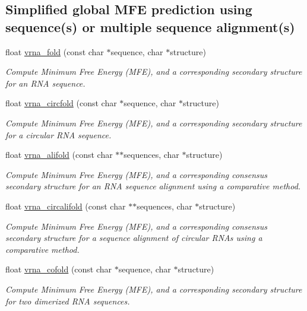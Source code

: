 \subsection*{Simplified global M\+FE prediction using sequence(s) or multiple sequence alignment(s)}
\begin{DoxyCompactItemize}
\item 
float \hyperlink{group__mfe__global_ga29a33b2895f4e67b0480271ff289afdc}{vrna\+\_\+fold} (const char $\ast$sequence, char $\ast$structure)
\begin{DoxyCompactList}\small\item\em Compute Minimum Free Energy (M\+FE), and a corresponding secondary structure for an R\+NA sequence. \end{DoxyCompactList}\item 
float \hyperlink{group__mfe__global_gaf973483d8acbc8cc9aacfc8a9b7f0074}{vrna\+\_\+circfold} (const char $\ast$sequence, char $\ast$structure)
\begin{DoxyCompactList}\small\item\em Compute Minimum Free Energy (M\+FE), and a corresponding secondary structure for a circular R\+NA sequence. \end{DoxyCompactList}\item 
float \hyperlink{group__mfe__global_ga6c9d3bef3e92c6d423ffac9f981418c1}{vrna\+\_\+alifold} (const char $\ast$$\ast$sequences, char $\ast$structure)
\begin{DoxyCompactList}\small\item\em Compute Minimum Free Energy (M\+FE), and a corresponding consensus secondary structure for an R\+NA sequence alignment using a comparative method. \end{DoxyCompactList}\item 
float \hyperlink{group__mfe__global_ga17a1be7490468c29c335ba9bffacba53}{vrna\+\_\+circalifold} (const char $\ast$$\ast$sequences, char $\ast$structure)
\begin{DoxyCompactList}\small\item\em Compute Minimum Free Energy (M\+FE), and a corresponding consensus secondary structure for a sequence alignment of circular R\+N\+As using a comparative method. \end{DoxyCompactList}\item 
float \hyperlink{group__mfe__global_ga9ef3a297201dbf838a8daff2b45c0c82}{vrna\+\_\+cofold} (const char $\ast$sequence, char $\ast$structure)
\begin{DoxyCompactList}\small\item\em Compute Minimum Free Energy (M\+FE), and a corresponding secondary structure for two dimerized R\+NA sequences. \end{DoxyCompactList}\end{DoxyCompactItemize}


